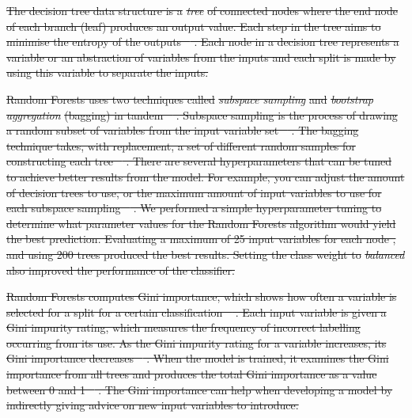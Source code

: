 \documentclass[]{interact}
\theoremstyle{plain}%
\theoremstyle{definition}
\theoremstyle{remark}
\providecommand{\DIFdeltex}[1]{{\protect\color{red}\sout{#1}}}                      %
\providecommand{\DIFdelbegin}{} %
\providecommand{\DIFdel}[1]{\texorpdfstring{\DIFdeltex{#1}}{}} %
\begin{document}
\DIFdelbegin \DIFdel{The decision tree data structure is a }\textit{\DIFdel{tree}} %
\DIFdel{of connected nodes where the end node of each branch (leaf) produces an output value. Each step in the tree aims to minimise the entropy of the outputs \mbox{%
\citep{kotsiantis}}\hspace{0pt}%
. Each node in a decision tree represents a variable or an abstraction of variables from the inputs and each split is made by using this variable to separate the inputs.
}%

\DIFdel{Random Forests uses two techniques called }\textit{\DIFdel{subspace sampling}} %
\DIFdel{and }\textit{\DIFdel{bootstrap aggregation}} %
\DIFdel{(bagging) in tandem \mbox{%
\citep{breiman}}\hspace{0pt}%
. Subspace sampling is the process of drawing a random subset of variables from the input variable set \mbox{%
\citet{ho}}\hspace{0pt}%
. The bagging technique takes, with replacement, a set of different random samples for constructing each tree \mbox{%
\citep{flach}}\hspace{0pt}%
. There are several hyperparameters that can be tuned to achieve better results from the model. For example, you can adjust the amount of decision trees to use, or the maximum amount of input variables to use for each subspace sampling \mbox{%
\citep{scikit-learn}}\hspace{0pt}%
. We performed a simple hyperparameter tuning to determine what parameter values for the Random Forests algorithm would yield the best prediction. Evaluating a maximum of 25 input variables for each node , and using 200 trees produced the best results. Setting the class weight to }\textit{\DIFdel{balanced}} %
\DIFdel{also improved the performance of the classifier.
}%


\DIFdel{Random Forests computes Gini importance, which shows how often a variable is selected for a split for a certain classification \mbox{%
\citep{gini}}\hspace{0pt}%
. Each input variable is given a Gini impurity rating, which measures the frequency of incorrect labelling occurring from its use. As the Gini impurity rating for a variable increases, its Gini importance decreases \mbox{%
\citep{gini}}\hspace{0pt}%
. When the model is trained, it examines the Gini importance from all trees and produces the total Gini importance as a value between 0 and 1 \mbox{%
\citep{gini}}\hspace{0pt}%
. The Gini importance can help when developing a model by indirectly giving advice on new input variables to introduce.
}%
\end{document}
